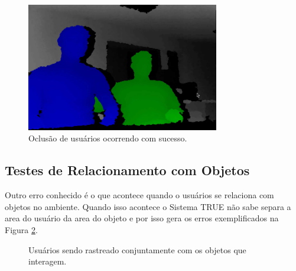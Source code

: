 		
		\begin{figure}[H]
			\begin{center}
				\includegraphics[width=0.75\textwidth]{figuras/5.Testes/oclusao/oclusao_corretamente.png}
			\end{center}
			\caption{Oclusão de usuários ocorrendo com sucesso.}
			\label{fig:testes_oclusao_sucesso}
		\end{figure}
		
	
	\subsection{Testes de Relacionamento com Objetos}
	
		Outro erro conhecido é o que acontece quando o usuários se relaciona com
		objetos no ambiente. Quando isso acontece o Sistema TRUE não sabe separa a
		area do usuário da area do objeto e por isso gera os
		erros exemplificados na Figura \ref{fig:testes_relacionamento_com_objetos}.
	
		\begin{figure}[H]
			\begin{center}
			\end{center}
			\caption{Usuários sendo rastreado conjuntamente com os objetos que
			interagem.}
			\label{fig:testes_relacionamento_com_objetos}
		\end{figure}
		
